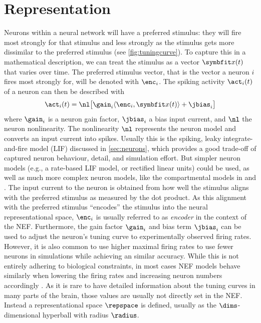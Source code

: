 \section{Representation}
Neurons within a neural network will have a preferred stimulus: they will fire most strongly for that stimulus and less strongly as the stimulus gets more dissimilar to the preferred stimulus (see \cref{fig:tuningcurve}).
To capture this in a mathematical description, we can treat the stimulus as a vector $\vc x(t)$ that varies over time.
The preferred stimulus vector, that is the vector a neuron $i$ fires most strongly for, will be denoted with $\enc_i$.
The spiking activity $\act_i(t)$ of a neuron can then be described with
\begin{equation}
    \act_i(t) = \nl\!\sbr{\gain_i \langle\enc_i, \vc x(t)\rangle + \jbias_i}
\end{equation}
where $\gain_i$ is a neuron gain factor, $\jbias_i$ a bias input current, and $\nl$ the neuron nonlinearity.
The nonlinearity $\nl$ represents the neuron model and converts an input current into spikes.
Usually this is the spiking, leaky integrate-and-fire model (LIF) discussed in \cref{sec:neurons}, which provides a good trade-off of captured neuron behaviour, detail, and simulation effort.
But simpler neuron models (e.g., a rate-based LIF model, or rectified linear units) could be used, as well as much more complex neuron models, like the compartmental models in \textcite{eliasmith2016} and \textcite{duggins2017c}.
The input current to the neuron is obtained from how well the stimulus aligns with the preferred stimulus as measured by the dot product.
As this alignment with the preferred stimulus ``encodes'' the stimulus into the neural representational space, $\enc_i$ is usually referred to as \emph{encoder} in the context of the NEF\@.
Furthermore, the gain factor $\gain_i$ and bias term $\jbias_i$ can be used to adjust the neuron's tuning curve to experimentally observed firing rates.
However, it is also common to use higher maximal firing rates to use fewer neurons in simulations while achieving an similar accuracy.
While this is not entirely adhering to biological constraints, in most cases NEF models behave similarly when lowering the firing rates and increasing neuron numbers accordingly \parencite[e.g.,][]{gosmann2015}.
As it is rare to have detailed information about the tuning curves in many parts of the brain, those values are usually not directly set in the NEF\@.
Instead a representational space $\repspace$ is defined, usually as the $\dims$-dimensional hyperball with radius $\radius$.
